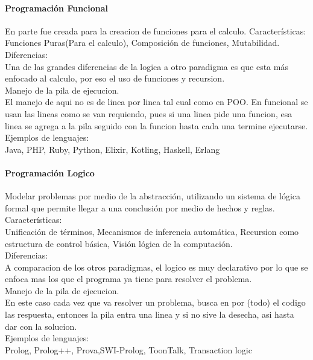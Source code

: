 \documentclass[12pt]{article}
\begin{document}
\paragraph{Programación Funcional}
En parte fue creada para la creacion de funciones para el calculo. Características:\\
Funciones Puras(Para el calculo), Composición de funciones, Mutabilidad.\\
Diferencias:\\
Una de las grandes diferencias de la logica a otro paradigma es que esta más enfocado al calculo, por eso el uso de funciones y recursion.\\
Manejo de la pila de ejecucion.\\
El manejo de aqui no es de linea por linea tal cual como en POO. En funcional se usan las lineas como se van requiendo, pues si una linea pide una funcion, esa linea se agrega a la pila seguido con la funcion hasta cada una termine ejecutarse.\\
Ejemplos de lenguajes:\\
Java, PHP, Ruby, Python, Elixir, Kotling, Haskell, Erlang
\paragraph{Programación Logico}
Modelar problemas por medio de la abstracción, utilizando un sistema de lógica formal que permite llegar a una conclusión por medio de hechos y reglas. Características:\\
Unificación de términos, Mecanismos de inferencia automática, Recursion como estructura de control básica, Visión lógica de la computación.\\
Diferencias:\\
A comparacion de los otros paradigmas, el logico es muy declarativo por lo que se enfoca mas los que el programa ya tiene para resolver el problema.\\
Manejo de la pila de ejecucion.\\
En este caso cada vez que va resolver un problema, busca en por (todo) el codigo las respuesta, entonces la pila entra una linea y si no sive la desecha, asi hasta dar con la solucion.\\
Ejemplos de lenguajes:\\
Prolog, Prolog++, Prova,SWI-Prolog, ToonTalk, Transaction logic
\end{document}
